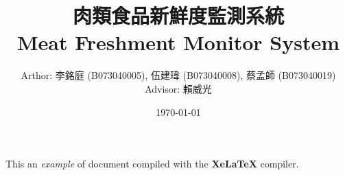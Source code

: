 \documentclass[a4paper]{report}
\title{
	肉類食品新鮮度監測系統\\
	Meat Freshment Monitor System
}
\author{
	Arthor: 李銘庭 (B073040005), 伍建瑋 (B073040008), 蔡孟師 (B073040019)\\
	Advisor: 賴威光
}
\date{\today}
\begin{document}
\maketitle
     
This an \textit{example} of document compiled with the  
\textbf{XeLaTeX} compiler.

    
\end{document}

